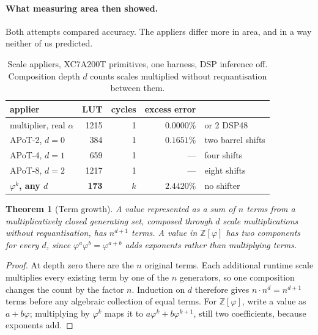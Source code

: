 \documentclass[11pt]{article}
\newtheorem{theorem}{Theorem}
\theoremstyle{definition}
\begin{document}
\paragraph{What measuring area then showed.} Both attempts compared accuracy. The
appliers differ more in area, and in a way neither of us predicted.

\begin{table}[t]\centering
\caption{Scale appliers, XC7A200T primitives, one harness, DSP inference off.
Composition depth $d$ counts scales multiplied without requantisation between
them.}
\label{tab:scalefrontier}
\begin{tabular}{lrrrl}
\toprule
applier & LUT & cycles & excess error & \\
\midrule
multiplier, real $\alpha$ & 1215 & 1 & $0.0000\%$ & or 2 DSP48 \\
APoT-2, $d=0$ & 384 & 1 & $0.1651\%$ & two barrel shifts \\
APoT-4, $d=1$ & 659 & 1 & --- & four shifts \\
APoT-8, $d=2$ & 1217 & 1 & --- & eight shifts \\
\textbf{$\varphi^{k}$, any $d$} & \textbf{173} & $k$ & $2.4420\%$ & no shifter \\
\bottomrule
\end{tabular}
\end{table}

\begin{theorem}[Term growth]
\label{thm:termgrowth}
A value represented as a sum of $n$ terms from a multiplicatively closed
generating set, composed through $d$ scale multiplications without
requantisation, has $n^{d+1}$ terms. A value in $\mathbb{Z}[\varphi]$ has two
components for every $d$, since $\varphi^{a}\varphi^{b} = \varphi^{a+b}$ adds
exponents rather than multiplying terms.
\end{theorem}
\begin{proof}
At depth zero there are the $n$ original terms.  Each additional runtime scale
multiplies every existing term by one of the $n$ generators, so one composition
changes the count by the factor $n$.  Induction on $d$ therefore gives
$n\cdot n^{d}=n^{d+1}$ terms before any algebraic collection of equal terms.
For $\mathbb{Z}[\varphi]$, write a value as $a+b\varphi$; multiplying by
$\varphi^{k}$ maps it to
$a\varphi^{k}+b\varphi^{k+1}$, still two coefficients, because exponents add.
\end{proof}
\end{document}
